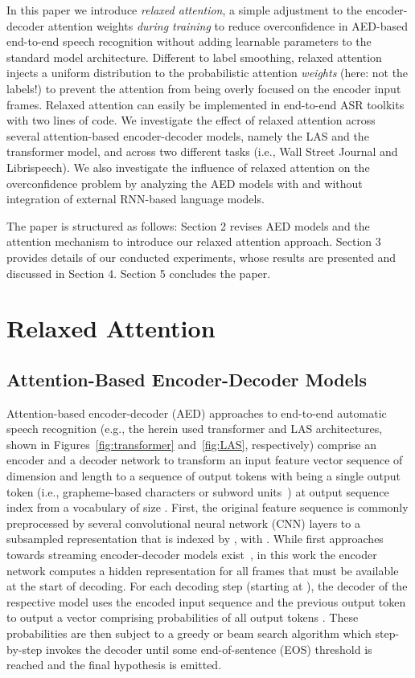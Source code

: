 \documentclass{article}
\begin{document}
In this paper we introduce \textit{relaxed attention}, a simple adjustment to the encoder-decoder attention weights \textit{during training} to reduce overconfidence in AED-based end-to-end speech recognition without adding learnable parameters to the standard model architecture. Different to label smoothing, relaxed attention injects a uniform distribution to the probabilistic attention \textit{weights} (here: not the labels!) to prevent the attention from being overly focused on the encoder input frames. Relaxed attention can easily be implemented in end-to-end ASR toolkits with two lines of code. We investigate the effect of relaxed attention across several attention-based encoder-decoder models, namely the LAS and the transformer model, and across two different tasks (i.e., Wall Street Journal and Librispeech). We also investigate the influence of relaxed attention on the overconfidence problem by ana\-lyzing the AED models with and without integration of external RNN-based language models. 

The paper is structured as follows: Section 2 revises AED models and the attention mechanism to introduce our relaxed attention approach. Section 3 provides details of our conducted experiments, whose results are presented and discussed in Section 4. Section 5 concludes the paper. 
\vspace{-2mm}
\section{Relaxed Attention}	\vspace{-3mm}
\subsection{Attention-Based Encoder-Decoder Models}\vspace{-2mm}
Attention-based encoder-decoder (AED) approaches to end-to-end automatic speech recognition (e.g., the herein used transformer and LAS architectures, shown in Figures~\ref{fig:transformer} and~\ref{fig:LAS}, respectively) comprise an encoder and a decoder network to transform an input feature vector sequence  of dimension  and length  to a sequence of output tokens  with  being a single output token (i.e., grapheme-based characters or subword units~\cite{Kudo2018}) at output sequence index  from a vocabulary of size . First, the original feature sequence  is commonly preprocessed by several convolutional neural network (CNN) layers to a subsampled representation that is indexed by , with . While first approaches towards streaming encoder-decoder models exist~\cite{Kim2019b,Moritz2020}, in this work the encoder network computes a hidden representation  for all  frames that must be available at the start of decoding. For each decoding step (starting at ), the decoder of the respective model uses the encoded input sequence  and the previous output token  to output a vector  comprising probabilities of all output tokens . These probabilities are then subject to a greedy or beam search algorithm which step-by-step invokes the decoder until some end-of-sentence (EOS) threshold is reached and the final hypothesis is emitted. 
\end{document}
